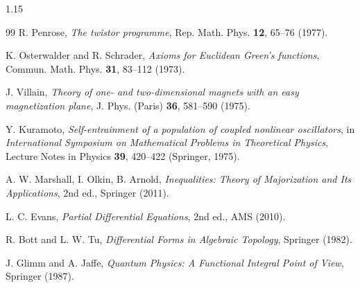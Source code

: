\documentclass[12pt,a4paper]{article}
\numberwithin{equation}{section}
\theoremstyle{definition}
\theoremstyle{plain}
\theoremstyle{remark}
\begin{document}
\begin{spacing}{1.15}
\begin{thebibliography}{99}
R. Penrose, \emph{The twistor programme}, Rep. Math. Phys. \textbf{12}, 65–76 (1977).

K. Osterwalder and R. Schrader, \emph{Axioms for Euclidean Green’s functions}, Commun. Math. Phys. \textbf{31}, 83–112 (1973).

J. Villain, \emph{Theory of one- and two-dimensional magnets with an easy magnetization plane}, J. Phys. (Paris) \textbf{36}, 581–590 (1975).

Y. Kuramoto, \emph{Self-entrainment of a population of coupled nonlinear oscillators}, in \emph{International Symposium on Mathematical Problems in Theoretical Physics}, Lecture Notes in Physics \textbf{39}, 420–422 (Springer, 1975).

A. W. Marshall, I. Olkin, B. Arnold, \emph{Inequalities: Theory of Majorization and Its Applications}, 2nd ed., Springer (2011).

L. C. Evans, \emph{Partial Differential Equations}, 2nd ed., AMS (2010).

R. Bott and L. W. Tu, \emph{Differential Forms in Algebraic Topology}, Springer (1982).

J. Glimm and A. Jaffe, \emph{Quantum Physics: A Functional Integral Point of View}, Springer (1987).

\end{thebibliography}

\end{spacing}
\end{document}
